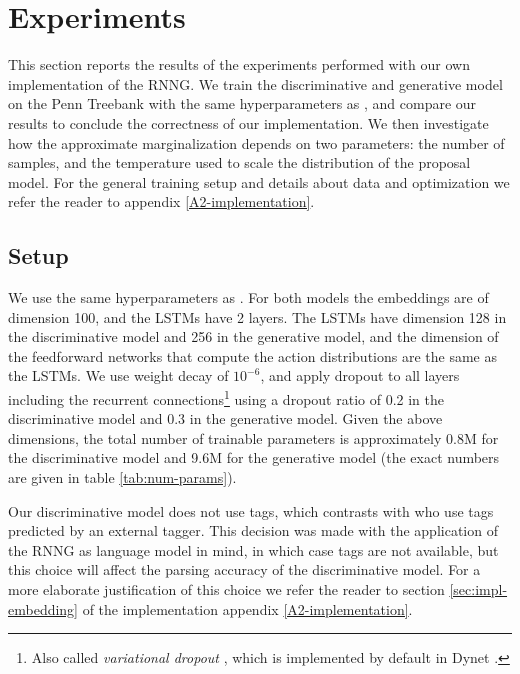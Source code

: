 \section{Experiments}
  This section reports the results of the experiments performed with our own implementation of the RNNG. We train the discriminative and generative model on the Penn Treebank with the same hyperparameters as \citet{dyer2016rnng}, and compare our results to conclude the correctness of our implementation. We then investigate how the approximate marginalization depends on two parameters: the number of samples, and the temperature used to scale the distribution of the proposal model. For the general training setup and details about data and optimization we refer the reader to appendix \ref{A2-implementation}.

  \subsection{Setup}
    We use the same hyperparameters as \citep{dyer2016rnng}. For both models the embeddings are of dimension 100, and the LSTMs have 2 layers. The LSTMs have dimension 128 in the discriminative model and 256 in the generative model, and the dimension of the feedforward networks that compute the action distributions are the same as the LSTMs. We use weight decay of $10^{-6}$, and apply dropout to all layers including the recurrent connections\footnote{Also called \textit{variational dropout} \citep{gal2016theoretically}, which is implemented by default in Dynet \citep{neubig2017dynet}.} using a dropout ratio of 0.2 in the discriminative model and 0.3 in the generative model. Given the above dimensions, the total number of trainable parameters is approximately 0.8M for the discriminative model and 9.6M for the generative model (the exact numbers are given in table \ref{tab:num-params}).

    Our discriminative model does not use tags, which contrasts with \citet{dyer2016rnng} who use tags predicted by an external tagger. This decision was made with the application of the RNNG as language model in mind, in which case tags are not available, but this choice will affect the parsing accuracy of the discriminative model. For a more elaborate justification of this choice we refer the reader to section \ref{sec:impl-embedding} of the implementation appendix \ref{A2-implementation}.


